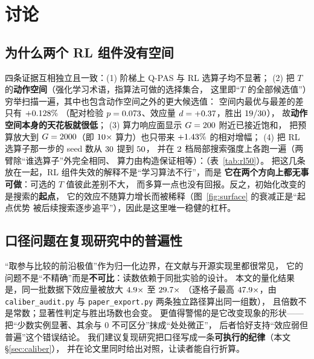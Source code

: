\documentclass[UTF8, a4paper, 11pt]{ctexart}
\begin{document}


\section{讨论}

\subsection{为什么两个 RL 组件没有空间}
四条证据互相独立且一致：(1) 阶梯上 Q-PAS 与 RL 选算子均不显著；
(2) 把 $T$ 的\textbf{动作空间}（强化学习术语，指算法可做的选择集合，
这里即“$T$ 的全部候选值”）穷举扫描一遍，其中也包含动作空间之外的更大候选值：
空间内最优与最差的差只有 $+0.128\%$
（配对检验 $p=0.073$、效应量 $d=+0.37$，胜出 $19/30$），
\TscanNote
故\textbf{动作空间本身的天花板就很低}；
(3) 算力响应面显示 $G=200$ 附近已接近饱和，
把预算放大到 $G=2000$（即 $10\times$ 算力）也只带来
$+1.43\%$ 的相对增幅；
(4) 把 RL 选算子那一步的 seed 数从 $30$ 提到 $50$，
并在 $2$ 档局部搜索强度上各跑一遍（两臂除“谁选算子”外完全相同、
算力由构造保证相等）：\RlFiftyVerdict（表~\ref{tab:rl50}）。
把这几条放在一起，RL 组件失效的解释不是“学习算法不行”，而是
\textbf{它在两个方向上都无事可做}：可选的 $T$ 值彼此差别不大，
而多算一点也没有回报。反之，初始化改变的是搜索的\textbf{起点}，
它的效应不随算力增长而被稀释（图~\ref{fig:surface} 的衰减正是“起点优势
被后续搜索逐步追平”），因此是这里唯一稳健的杠杆。



\subsection{口径问题在复现研究中的普遍性}
“取参与比较的前沿极值”作为归一化边界，在文献与开源实现里都很常见，
它的问题不是“不精确”而是\textbf{不可比}：读数依赖于同批实验的设计。
本文的量化结果是，同一批数据下效应量被放大 $4.9\times$ 至 $29.7\times$
（逐格子最高 $47.9\times$，由 \texttt{caliber\_audit.py} 与
\texttt{paper\_export.py} 两条独立路径算出同一组数），
且倍数不是常数；显著性判定与胜出场数也会变。
更值得警惕的是它改变现象的形状——把“少数实例显著、其余与 0 不可区分”抹成“处处微正”，
后者恰好支持“效应弱但普遍”这个错误结论。
我们建议复现研究把口径写成一条\textbf{可执行的纪律}（本文 \S\ref{sec:caliber}），
并在论文里同时给出对照，让读者能自行折算。
\end{document}
